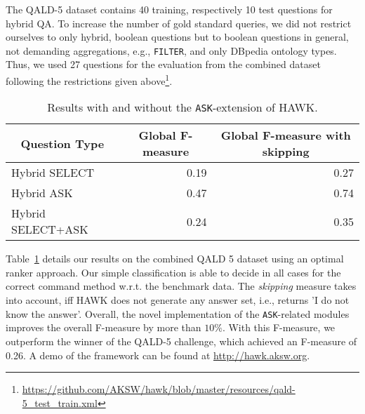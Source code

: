 \documentclass{llncs}
\begin{document}
The QALD-5 dataset contains 40 training, respectively 10 test questions for hybrid QA.
To increase the number of gold standard queries, we did not restrict ourselves to only hybrid, boolean questions but to boolean questions in general, not demanding aggregations, e.g., \texttt{FILTER}, and only DBpedia ontology types.
Thus, we used 27 questions for the evaluation from the combined dataset following the restrictions given above\footnote{\url{https://github.com/AKSW/hawk/blob/master/resources/qald-5_test_train.xml}}.

\begin{table}[]
\centering
\caption{Results with and without the \texttt{ASK}-extension of HAWK.}
\label{tab:eval_ask}
\begin{tabular}{@{}lrr@{}}
\toprule
\multicolumn{1}{c}{{\bf Question Type}} & \multicolumn{1}{c}{{\bf Global F-measure}} & \multicolumn{1}{c}{{\bf Global F-measure with skipping}} \\ \midrule
Hybrid SELECT                           & 0.19                                       & 0.27                                                     \\
Hybrid ASK                              & 0.47                                       & 0.74                                                     \\
Hybrid SELECT+ASK                       & 0.24                                       & 0.35                                                     \\ \bottomrule
\end{tabular}
\end{table}

Table~\ref{tab:eval_ask} details our results on the combined QALD 5 dataset using an optimal ranker approach. 
Our simple classification is able to decide in all cases for the correct command method w.r.t. the benchmark data.
The \emph{skipping} measure takes into account, iff HAWK does not generate any answer set, i.e., returns 'I do not know the answer'.
Overall, the novel implementation of the \texttt{ASK}-related modules improves the overall F-measure by more than $10\%$. With this F-measure, we outperform the winner of the QALD-5 challenge, which achieved an F-measure of 0.26. 
A demo of the framework can be found at \url{http://hawk.aksw.org}.
\end{document}
